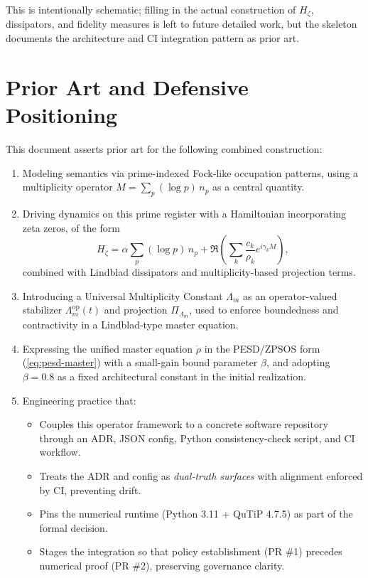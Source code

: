 \documentclass[11pt]{article}
\begin{document}
This is intentionally schematic; filling in the actual construction of \(H_\zeta\), dissipators, and fidelity measures is left to future detailed work, but the skeleton documents the architecture and CI integration pattern as prior art.

\section{Prior Art and Defensive Positioning}

This document asserts prior art for the following combined construction:

\begin{enumerate}[nosep]
  \item Modeling semantics via prime-indexed Fock-like occupation patterns, using a multiplicity operator \(M = \sum_p (\log p)\,n_p\) as a central quantity.
  \item Driving dynamics on this prime register with a Hamiltonian incorporating zeta zeros, of the form
    \[
      H_\zeta = \alpha \sum_p (\log p)\,n_p + \Re\left( \sum_{k} \frac{c_k}{\rho_k} e^{i \gamma_k M} \right),
    \]
    combined with Lindblad dissipators and multiplicity-based projection terms.
  \item Introducing a Universal Multiplicity Constant \(\Lambda_m\) as an operator-valued stabilizer \(\Lambda_m^{\mathrm{op}}(t)\) and projection \(\Pi_{\Lambda_m}\), used to enforce boundedness and contractivity in a Lindblad-type master equation.
  \item Expressing the unified master equation \(\dot{\rho}\) in the PESD/ZPSOS form (\ref{eq:pesd-master}) with a small-gain bound parameter \(\beta\), and adopting \(\beta = 0.8\) as a fixed architectural constant in the initial realization.
  \item Engineering practice that:
    \begin{itemize}[nosep]
      \item Couples this operator framework to a concrete software repository through an ADR, JSON config, Python consistency-check script, and CI workflow.
      \item Treats the ADR and config as \emph{dual-truth surfaces} with alignment enforced by CI, preventing drift.
      \item Pins the numerical runtime (Python 3.11 + QuTiP 4.7.5) as part of the formal decision.
      \item Stages the integration so that policy establishment (PR \#1) precedes numerical proof (PR \#2), preserving governance clarity.
    \end{itemize}
\end{enumerate}
\end{document}

